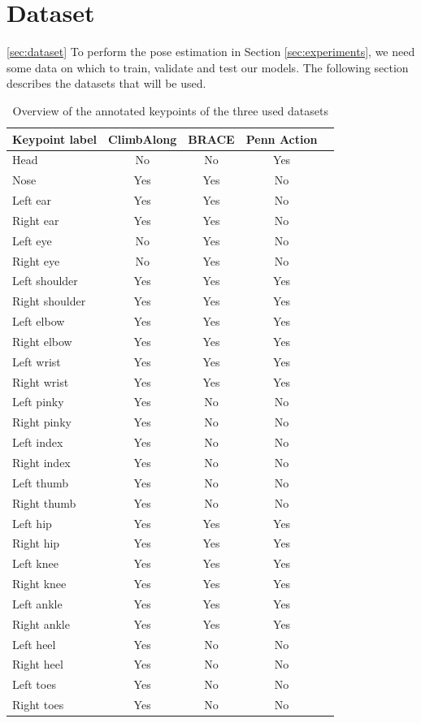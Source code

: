 \documentclass[./main.tex]{subfiles}
\begin{document}
\section{Dataset}
\ref{sec:dataset}
To perform the pose estimation in Section \ref{sec:experiments}, we need some data on which to train, validate and test our models. The following section describes the datasets that will be used.

\begin{table}[htbp]
    \begin{tabular}{|l|c|c|c|c|}
        \hline
        \textbf{Keypoint label} & \textbf{ClimbAlong} & \textbf{BRACE} & \textbf{Penn Action} \\ \hline
        Head & No & No & Yes \\ \hline
        Nose & Yes & Yes & No \\ \hline
        Left ear & Yes & Yes & No \\ \hline
        Right ear & Yes & Yes & No \\ \hline
        Left eye & No & Yes & No \\ \hline
        Right eye & No & Yes & No \\ \hline
        Left shoulder & Yes & Yes & Yes \\ \hline
        Right shoulder & Yes & Yes & Yes \\ \hline
        Left elbow & Yes & Yes & Yes \\ \hline
        Right elbow & Yes & Yes & Yes \\ \hline
        Left wrist & Yes & Yes & Yes \\ \hline
        Right wrist & Yes & Yes & Yes \\ \hline
        Left pinky & Yes & No & No \\ \hline
        Right pinky & Yes & No & No \\ \hline
        Left index & Yes & No & No \\ \hline
        Right index & Yes & No & No \\ \hline
        Left thumb & Yes & No & No \\ \hline
        Right thumb & Yes & No & No \\ \hline
        Left hip & Yes & Yes & Yes \\ \hline
        Right hip & Yes & Yes & Yes \\ \hline
        Left knee & Yes & Yes & Yes \\ \hline
        Right knee & Yes & Yes & Yes \\ \hline
        Left ankle & Yes & Yes & Yes \\ \hline
        Right ankle & Yes & Yes & Yes \\ \hline
        Left heel & Yes & No & No \\ \hline
        Right heel & Yes & No & No \\ \hline
        Left toes & Yes & No & No \\ \hline
        Right toes & Yes & No & No \\ \hline
    \end{tabular}
    \caption{Overview of the annotated keypoints of the three used datasets}
    \label{tab:keypoints}
\end{table}
\end{document}
